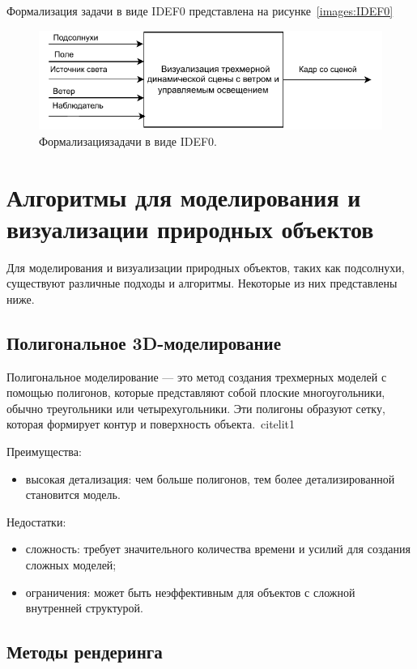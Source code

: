 Формализация задачи в виде IDEF0 представлена на рисунке~\ref{images:IDEF0}

\begin{figure}[H]
    \centering
    \includegraphics[width=130mm]{images/IDEF0}
    \caption{Формализациязадачи в виде IDEF0.}
    \label{images:generate_perms}
\end{figure}



\section{Алгоритмы для моделирования и визуализации природных объектов}

Для моделирования и визуализации природных объектов, таких как подсолнухи, существуют различные подходы и алгоритмы. Некоторые из них представлены ниже.


\subsection{Полигональное 3D-моделирование}
Полигональное моделирование — это метод создания трехмерных моделей с помощью полигонов, которые представляют собой плоские многоугольники, обычно треугольники или четырехугольники. Эти полигоны образуют сетку, которая формирует контур и поверхность объекта.~cite{lit1}

Преимущества:
\begin{itemize}
    \item высокая детализация: чем больше полигонов, тем более детализированной становится модель.
\end{itemize}

Недостатки:
\begin{itemize}
    \item сложность: требует значительного количества времени и усилий для создания сложных моделей;
    \item ограничения: может быть неэффективным для объектов с сложной внутренней структурой.
\end{itemize}

\subsection{Методы рендеринга}


